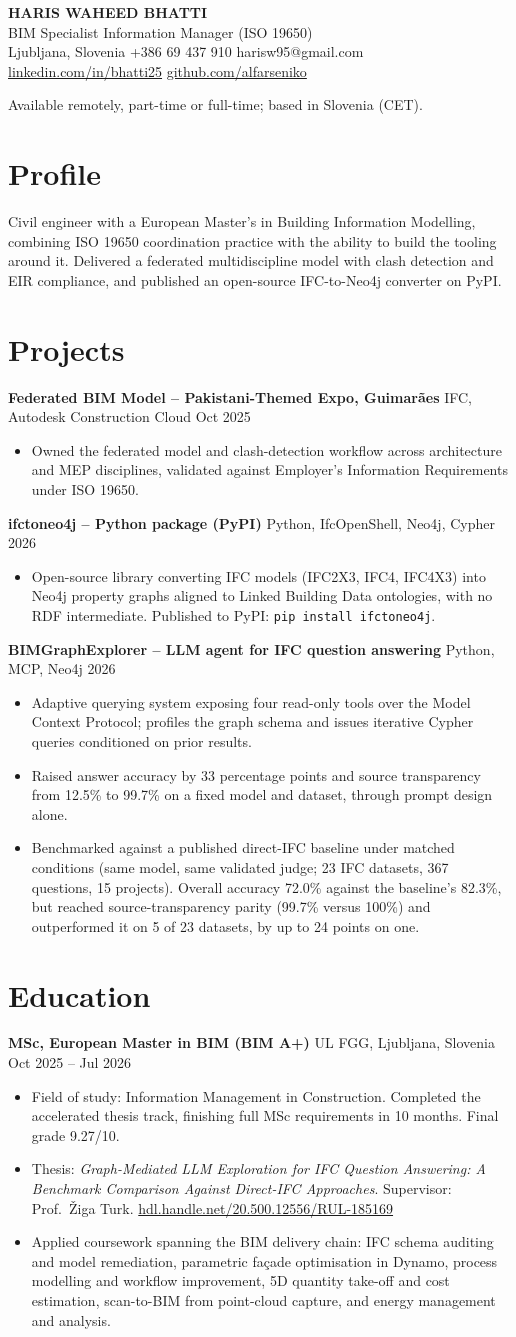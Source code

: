 \documentclass[a4paper,10.5pt]{article}
\newcommand{\datefill}{\dotfill}
\newcommand{\entry}[3]{\vspace{2.5pt}\noindent\textbf{#1} \textbar{} #2 \datefill{} #3\par\vspace{0.5pt}}
\newcommand{\ROLELINE}{BIM Specialist \textbar{} Information Manager (ISO 19650)}
\newcommand{\projIfcToNeo}{%
\entry{ifctoneo4j -- Python package (PyPI)}{Python, IfcOpenShell, Neo4j, Cypher}{2026}
\begin{itemize}
  \item Open-source library converting IFC models (IFC2X3, IFC4, IFC4X3) into Neo4j
        property graphs aligned to Linked Building Data ontologies, with no RDF
        intermediate. Published to PyPI: \texttt{pip install ifctoneo4j}.
\end{itemize}}
\newcommand{\projBIMGraph}{%
\entry{BIMGraphExplorer -- LLM agent for IFC question answering}{Python, MCP, Neo4j}{2026}
\begin{itemize}
  \item Adaptive querying system exposing four read-only tools over the Model
        Context Protocol; profiles the graph schema and issues iterative Cypher
        queries conditioned on prior results.
  \item Raised answer accuracy by 33 percentage points and source transparency from
        12.5\% to 99.7\% on a fixed model and dataset, through prompt design alone.
  \item Benchmarked against a published direct-IFC baseline under matched
        conditions (same model, same validated judge; 23 IFC datasets, 367
        questions, 15 projects). Overall accuracy 72.0\% against the baseline's
        82.3\%, but reached source-transparency parity (99.7\% versus 100\%) and
        outperformed it on 5 of 23 datasets, by up to 24 points on one.
\end{itemize}}
\newcommand{\projGuimaraes}{%
\entry{Federated BIM Model -- Pakistani-Themed Expo, Guimar\~aes}{IFC, Autodesk Construction Cloud}{Oct 2025}
\begin{itemize}
  \item Owned the federated model and clash-detection workflow across architecture
        and MEP disciplines, validated against Employer's Information Requirements
        under ISO 19650.
\end{itemize}}
\begin{document}
\begin{center}
  {\LARGE\bfseries HARIS WAHEED BHATTI}\\[2pt]
  {\large \ROLELINE}\\[3pt]
  Ljubljana, Slovenia \textbar{} +386 69 437 910 \textbar{} harisw95@gmail.com\\
  \href{https://linkedin.com/in/bhatti25}{linkedin.com/in/bhatti25} \textbar{}
  \href{https://github.com/alfarseniko}{github.com/alfarseniko}
\end{center}
\vspace{-4pt}
\noindent\small Available remotely, part-time or full-time; based in Slovenia
(CET).\normalsize

\section{Profile}

\noindent Civil engineer with a European Master's in Building Information Modelling,
combining ISO 19650 coordination practice with the ability to build the tooling
around it. Delivered a federated multidiscipline model with clash detection and EIR
compliance, and published an open-source IFC-to-Neo4j converter on PyPI.

\section{Projects}

 \projGuimaraes \projIfcToNeo \projBIMGraph

\section{Education}
\entry{MSc, European Master in BIM (BIM A+)}{UL FGG, Ljubljana, Slovenia}{Oct 2025 -- Jul 2026}
\begin{itemize}
  \item Field of study: Information Management in Construction. Completed the
        accelerated thesis track, finishing full MSc requirements in 10 months.
        Final grade 9.27/10.
  \item Thesis: \textit{Graph-Mediated LLM Exploration for IFC Question Answering:
        A Benchmark Comparison Against Direct-IFC Approaches}. Supervisor:
        Prof.~\v{Z}iga Turk. \href{http://hdl.handle.net/20.500.12556/RUL-185169}{hdl.handle.net/20.500.12556/RUL-185169}
  \item Applied coursework spanning the BIM delivery chain: IFC schema auditing and model remediation, parametric façade optimisation in Dynamo, process modelling and workflow improvement, 5D quantity take-off and cost estimation, scan-to-BIM from point-cloud capture, and energy management and analysis.
\end{itemize}
\end{document}
